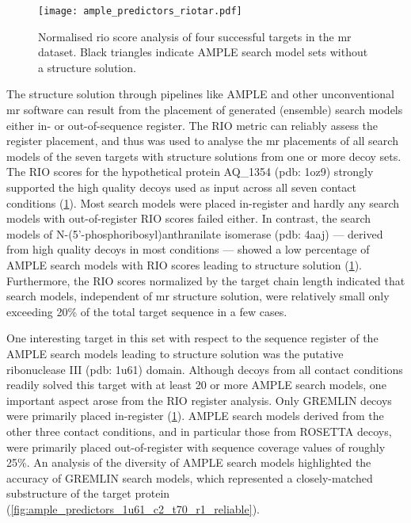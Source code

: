 \begin{figure}[H]
    \centering
    \texttt{[image: ample\_predictors\_riotar.pdf]}
    \caption[RIO score analysis of successful targets]{Normalised \gls{rio} score analysis of four successful targets in the \gls{mr} dataset. Black triangles indicate AMPLE search model sets without a structure solution.}
    \label{fig:ample_predictor_riotar}
\end{figure}

The structure solution through pipelines like AMPLE and other unconventional \gls{mr} software \cite{Rodriguez2012-ad,Sammito2013-ug} can result from the placement of generated (ensemble) search models either in- or out-of-sequence register. The RIO metric \cite{Thomas2015-wu} can reliably assess the register placement, and thus was used to analyse the \gls{mr} placements of all search models of the seven targets with structure solutions from one or more decoy sets. The RIO scores for the hypothetical protein AQ\_1354 (\gls{pdb}: 1oz9) strongly supported the high quality decoys used as input across all seven contact conditions (\cref{fig:ample_predictor_riotar}). Most search models were placed in-register and hardly any search models with out-of-register RIO scores failed either. In contrast, the search models of N-(5’-phosphoribosyl)anthranilate isomerase (\gls{pdb}: 4aaj) --- derived from high quality decoys in most conditions --- showed a low percentage of AMPLE search models with RIO scores leading to structure solution (\cref{fig:ample_predictor_riotar}). Furthermore, the RIO scores normalized by the target chain length indicated that search models, independent of \gls{mr} structure solution, were relatively small only exceeding 20\% of the total target sequence in a few cases. 

One interesting target in this set with respect to the sequence register of the AMPLE search models leading to structure solution was the putative ribonuclease III (\gls{pdb}: 1u61) domain. Although decoys from all contact conditions readily solved this target with at least 20 or more AMPLE search models, one important aspect arose from the RIO register analysis. Only GREMLIN decoys were primarily placed in-register (\cref{fig:ample_predictor_riotar}). AMPLE search models derived from the other three contact conditions, and in particular those from ROSETTA decoys, were primarily placed out-of-register with sequence coverage values of roughly 25\%. An analysis of the diversity of AMPLE search models highlighted the accuracy of GREMLIN search models, which represented a closely-matched substructure of the target protein (\cref{fig:ample_predictors_1u61_c2_t70_r1_reliable}).  

